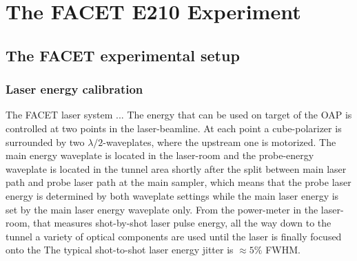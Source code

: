 \chapter{The FACET E210 Experiment}

\section{The FACET experimental setup}
\subsection{Laser energy calibration}
The FACET laser system ...
The energy that can be used on target of the OAP is controlled at two points in the laser-beamline.
At each point a cube-polarizer is surrounded by two  $\lambda/2$-waveplates, where the upstream one is motorized.
The main energy waveplate is located in the laser-room and the probe-energy waveplate is located in the tunnel area shortly after the split between main laser path and probe laser path at the main sampler, which means that the probe laser energy is determined by both waveplate settings while the main laser energy is set by the main laser energy waveplate only. From the power-meter in the laser-room, that measures shot-by-shot laser pulse energy, all the way down to the tunnel a variety of optical components are used until the laser is finally focused onto the 
The typical shot-to-shot laser energy jitter  is $\approx 5 \%$ FWHM.


